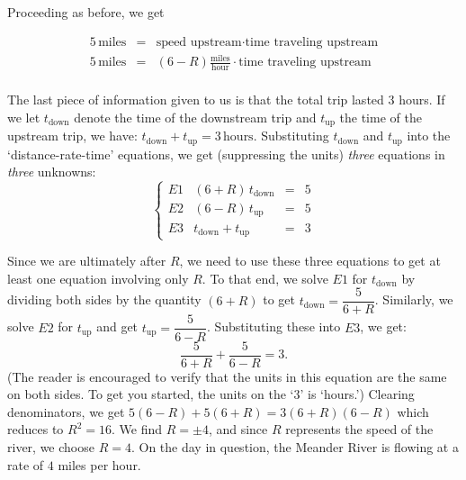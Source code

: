 {Proceeding as before, we get
 
 \[ \begin{array}{rcl}

5 \, \text{miles} & = & \text{speed upstream} \cdot \text{time traveling upstream} \\ 

5 \, \text{miles} & = & (6 - R) \frac{\text{miles}}{\text{hour}} \cdot \text{time traveling upstream} \\ 	\end{array} \]
 
The last piece of information given to us is that the total trip lasted $3$ hours.  If we let $t_{\text{down}}$ denote the time of the downstream trip and $t_{\text{up}}$ the time of the upstream trip, we have:    $t_{\text{down}} + t_{\text{up}} = 3 \, \text{hours}$.  Substituting $t_{\text{down}}$ and $t_{\text{up}}$ into the `distance-rate-time' equations, we get (suppressing the units) \textit{three} equations in \textit{three} unknowns:
 \[\left\{\begin{array}{lrcl}   E1 & (6+R) \, t_{\text{down}} & = & 5 \\ E2 & (6-R) \, t_{\text{up}} & = & 5 \\ E3 & t_{\text{down}} + t_{\text{up}} & = & 3 \end{array} \right.\]



Since we are ultimately after $R$, we need to use these three equations to get at least one equation involving only $R$.  To that end, we solve $E1$ for $t_{\text{down}}$ by dividing both sides by the quantity $(6+R)$ to get $t_{\text{down}} = \dfrac{5}{6+R}$.   Similarly, we solve $E2$ for $t_{\text{up}}$ and get $t_{\text{up}} = \dfrac{5}{6-R}$. Substituting these into $E3$, we get: \[\dfrac{5}{6+R} + \dfrac{5}{6 - R} = 3.\] 
(The reader is encouraged to verify that the units in this equation are the same on both sides.  To get you started, the units on the `3' is `hours.') Clearing denominators, we get $5(6-R) + 5(6+R) = 3(6+R)(6-R)$ which reduces to  $R^2 = 16$.   We find $R = \pm 4$, and since $R$ represents the speed of the river, we choose $R = 4$.   On the day in question, the Meander River is flowing at a rate of $4$ miles per hour. 


}

